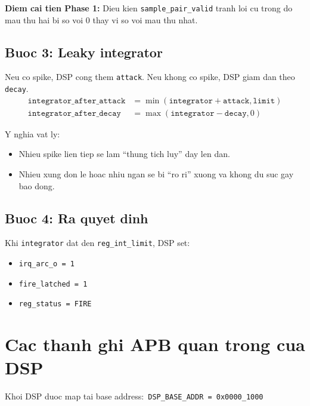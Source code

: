 \documentclass[12pt,a4paper]{article}
\begin{document}
\textbf{Diem cai tien Phase 1:} Dieu kien \texttt{sample\_pair\_valid} tranh loi cu trong do mau thu hai bi so voi 0 thay vi so voi mau thu nhat.

\subsection{Buoc 3: Leaky integrator}
Neu co spike, DSP cong them \texttt{attack}. Neu khong co spike, DSP giam dan theo \texttt{decay}.
\begin{align*}
\texttt{integrator\_after\_attack} &= \min(\texttt{integrator} + \texttt{attack}, \texttt{limit}) \\
\texttt{integrator\_after\_decay} &= \max(\texttt{integrator} - \texttt{decay}, 0)
\end{align*}

Y nghia vat ly:
\begin{itemize}
    \item Nhieu spike lien tiep se lam ``thung tich luy'' day len dan.
    \item Nhieu xung don le hoac nhiu ngan se bi ``ro ri'' xuong va khong du suc gay bao dong.
\end{itemize}

\subsection{Buoc 4: Ra quyet dinh}
Khi \texttt{integrator} dat den \texttt{reg\_int\_limit}, DSP set:
\begin{itemize}
    \item \texttt{irq\_arc\_o = 1}
    \item \texttt{fire\_latched = 1}
    \item \texttt{reg\_status = FIRE}
\end{itemize}

\section{Cac thanh ghi APB quan trong cua DSP}
Khoi DSP duoc map tai base address:\
\texttt{DSP\_BASE\_ADDR = 0x0000\_1000}
\end{document}
